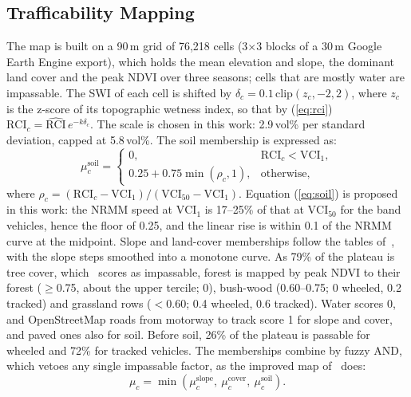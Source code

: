 \documentclass[conference]{IEEEtran}
\begin{document}
\subsection{Trafficability Mapping}
The map is built on a 90\,m grid of 76,218 cells (3$\times$3 blocks of a 30\,m Google Earth Engine
export), which holds the
mean elevation and slope, the dominant land cover and the peak NDVI over three seasons; cells that
are mostly water are impassable. The SWI of each cell is shifted by $\delta_c = 0.1\,
\mathrm{clip}(z_c, -2, 2)$, where $z_c$ is the z-score of its topographic wetness index, so that by (\ref{eq:rci})
$\mathrm{RCI}_c = \widehat{\mathrm{RCI}}\,e^{-k\delta_c}$. The scale is chosen in this work: 2.9\,vol\% per
standard deviation, capped at 5.8\,vol\%. The soil membership is expressed as:
\begin{equation}
  \mu^{\mathrm{soil}}_c =
  \begin{cases}
    0, & \mathrm{RCI}_c < \mathrm{VCI}_1, \\
    0.25 + 0.75\min(\rho_c, 1), & \text{otherwise},
  \end{cases}
  \label{eq:soil}
\end{equation}
where $\rho_c = (\mathrm{RCI}_c - \mathrm{VCI}_1)/(\mathrm{VCI}_{50} - \mathrm{VCI}_1)$. Equation
(\ref{eq:soil}) is proposed in this work: the NRMM speed at $\mathrm{VCI}_1$ is 17--25\% of that at
$\mathrm{VCI}_{50}$ for the band vehicles, hence the floor of 0.25, and the linear rise is within
0.1 of the NRMM curve at the midpoint. Slope and land-cover memberships follow the tables
of~\cite{liu2025}, with the slope steps smoothed into a monotone curve. As 79\% of the plateau is
tree cover, which~\cite{liu2025} scores as impassable, forest is mapped by peak NDVI to their
forest ($\geq$0.75, about the upper tercile; 0), bush-wood (0.60--0.75; 0 wheeled, 0.2 tracked) and
grassland rows ($<$0.60; 0.4 wheeled, 0.6 tracked). Water scores 0, and OpenStreetMap
roads from motorway to track score 1 for slope and cover, and paved ones also for soil. Before
soil, 26\% of the plateau is passable for wheeled and 72\% for tracked vehicles. The memberships
combine by fuzzy AND, which vetoes any single impassable factor, as the improved
map of~\cite{liu2025} does:
\begin{equation}
  \mu_c = \min\left(\mu^{\mathrm{slope}}_c,\ \mu^{\mathrm{cover}}_c,\ \mu^{\mathrm{soil}}_c\right).
  \label{eq:fuzzy}
\end{equation}
\end{document}
